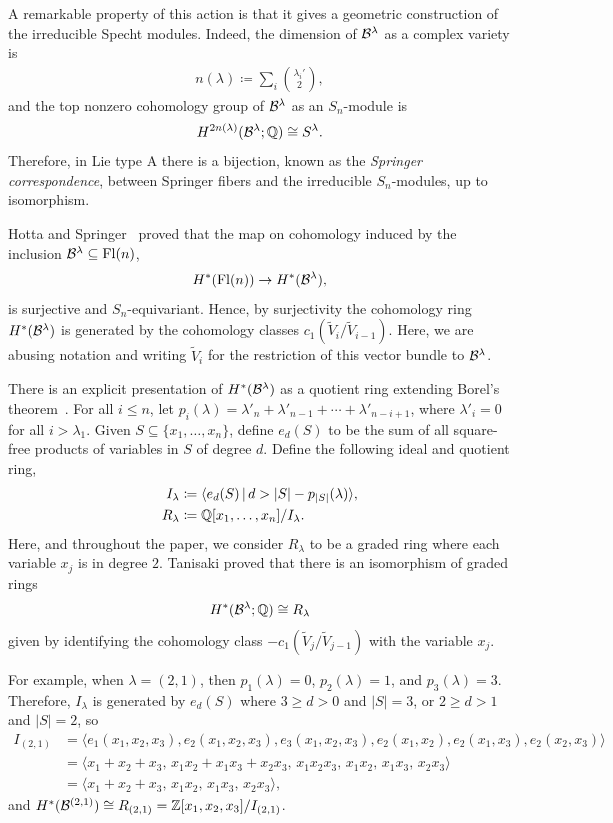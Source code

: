 \documentclass[12pt]{amsart}
\newcommand{\st}{\,|\,}
\newcommand{\Fl}{\mathrm{Fl}}
\newcommand{\la}{\lambda}
\begin{document}
A remarkable property of this action is that it gives a geometric construction of the irreducible Specht modules. Indeed, the dimension of $\mathcal{B}^\lambda$ as a complex variety is 
\begin{align}
    n(\lambda) \coloneqq \sum_i \binom{\lambda_i'}{2},
\end{align}
and the top nonzero cohomology group of $\mathcal{B}^\lambda$ as an $S_n$-module is
\begin{align}
    H^{2n(\lambda)}(\mathcal{B}^\lambda;\mathbb{Q}) \cong S^\lambda.
\end{align}
Therefore, in Lie type A there is a bijection, known as the \emph{Springer correspondence}, between Springer fibers and the irreducible $S_n$-modules, up to isomorphism. 

Hotta and Springer~\cite{Hotta-Springer} proved that the map on cohomology induced by the inclusion $\cB^\lambda \subseteq \Fl(n)$,
\begin{align}
    H^*(\Fl(n)) \to H^*(\cB^\lambda),
\end{align}
is surjective and $S_n$-equivariant. Hence, by surjectivity the cohomology ring $H^*(\mathcal{B}^\lambda)$ is generated by the cohomology classes $c_1(\widetilde V_i/\widetilde V_{i-1})$. Here, we are abusing notation and writing $\widetilde V_i$ for the restriction of this vector bundle to $\mathcal{B}^\lambda$. 

There is an explicit presentation of $H^*(\mathcal{B}^\lambda)$ as a quotient ring extending Borel's theorem~\cite{dCP,Tanisaki}. For all $i\leq n$, let $p_i(\lambda) = \la'_n + \la'_{n-1} +\cdots + \la'_{n-i+1}$, where $\la'_i = 0$ for all $i>\la_1$. Given $S\subseteq \{x_1,\dots, x_n\}$, define $e_d(S)$ to be the sum of all square-free products of variables in $S$ of degree $d$. Define the following ideal and quotient ring,
\begin{align}
    I_\lambda &\coloneqq \langle e_d(S) \st d > |S| - p_{|S|}(\lambda)\rangle,\\
    R_\lambda &\coloneqq \bQ[x_1,\dots, x_n]/I_\lambda.
\end{align}
Here, and throughout the paper, we consider $R_\lambda$ to be a graded ring where each variable $x_j$ is in degree $2$. Tanisaki proved that there is an isomorphism of graded rings
\begin{align}
    H^*(\mathcal{B}^\lambda;\mathbb{Q}) \cong R_\lambda
\end{align}
given by identifying the cohomology class $-c_1(\widetilde V_j/\widetilde V_{j-1})$ with the variable $x_j$.

For example, when $\lambda = (2,1)$, then $p_{1}(\lambda) = 0$, $p_2(\lambda) = 1$, and $p_3(\lambda) = 3$. Therefore, $I_\lambda$ is generated by $e_d(S)$ where $3\geq d>0$ and $|S|=3$, or $2\geq d>1$ and $|S| = 2$, so 
\begin{align}
I_{(2,1)} &= \langle e_1(x_1,x_2,x_3), e_2(x_1,x_2,x_3), e_3(x_1,x_2,x_3), e_2(x_1,x_2), e_2(x_1,x_3), e_2(x_2,x_3)\rangle\\
&= \langle x_1+x_2+x_3,\, x_1x_2+x_1x_3+x_2x_3,\, x_1x_2x_3,\, x_1x_2,\, x_1x_3,\, x_2x_3\rangle\\
&= \langle x_1+x_2+x_3,\, x_1x_2,\, x_1x_3,\, x_2x_3\rangle,
\end{align}
and $H^*(\mathcal{B}^{(2,1)})\cong R_{(2,1)} = \mathbb{Z}[x_1,x_2,x_3]/I_{(2,1)}$.
\end{document}
